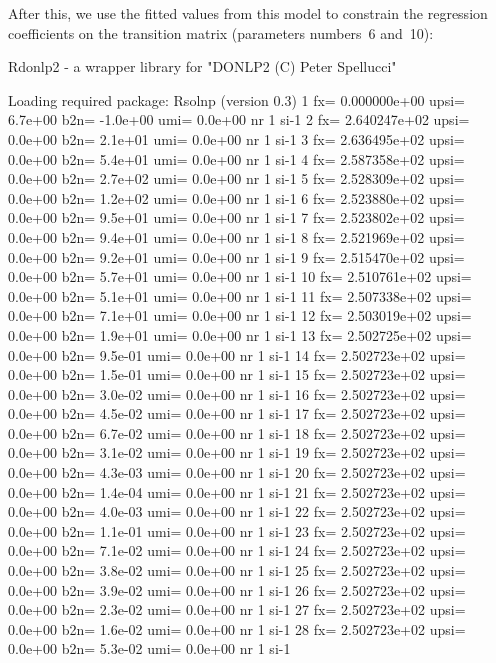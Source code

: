 \documentclass[article]{jss}
\begin{document}
After this, we use the fitted values from this model to constrain the
regression coefficients on the transition matrix (parameters numbers~6
and~10):
\begin{Schunk}
\begin{Soutput}
Rdonlp2 - a wrapper library for "DONLP2 (C) Peter Spellucci"


Loading required package: Rsolnp (version 0.3)
    1 fx=   0.000000e+00 upsi=  6.7e+00 b2n= -1.0e+00 umi=  0.0e+00 nr   1 si-1
    2 fx=   2.640247e+02 upsi=  0.0e+00 b2n=  2.1e+01 umi=  0.0e+00 nr   1 si-1
    3 fx=   2.636495e+02 upsi=  0.0e+00 b2n=  5.4e+01 umi=  0.0e+00 nr   1 si-1
    4 fx=   2.587358e+02 upsi=  0.0e+00 b2n=  2.7e+02 umi=  0.0e+00 nr   1 si-1
    5 fx=   2.528309e+02 upsi=  0.0e+00 b2n=  1.2e+02 umi=  0.0e+00 nr   1 si-1
    6 fx=   2.523880e+02 upsi=  0.0e+00 b2n=  9.5e+01 umi=  0.0e+00 nr   1 si-1
    7 fx=   2.523802e+02 upsi=  0.0e+00 b2n=  9.4e+01 umi=  0.0e+00 nr   1 si-1
    8 fx=   2.521969e+02 upsi=  0.0e+00 b2n=  9.2e+01 umi=  0.0e+00 nr   1 si-1
    9 fx=   2.515470e+02 upsi=  0.0e+00 b2n=  5.7e+01 umi=  0.0e+00 nr   1 si-1
   10 fx=   2.510761e+02 upsi=  0.0e+00 b2n=  5.1e+01 umi=  0.0e+00 nr   1 si-1
   11 fx=   2.507338e+02 upsi=  0.0e+00 b2n=  7.1e+01 umi=  0.0e+00 nr   1 si-1
   12 fx=   2.503019e+02 upsi=  0.0e+00 b2n=  1.9e+01 umi=  0.0e+00 nr   1 si-1
   13 fx=   2.502725e+02 upsi=  0.0e+00 b2n=  9.5e-01 umi=  0.0e+00 nr   1 si-1
   14 fx=   2.502723e+02 upsi=  0.0e+00 b2n=  1.5e-01 umi=  0.0e+00 nr   1 si-1
   15 fx=   2.502723e+02 upsi=  0.0e+00 b2n=  3.0e-02 umi=  0.0e+00 nr   1 si-1
   16 fx=   2.502723e+02 upsi=  0.0e+00 b2n=  4.5e-02 umi=  0.0e+00 nr   1 si-1
   17 fx=   2.502723e+02 upsi=  0.0e+00 b2n=  6.7e-02 umi=  0.0e+00 nr   1 si-1
   18 fx=   2.502723e+02 upsi=  0.0e+00 b2n=  3.1e-02 umi=  0.0e+00 nr   1 si-1
   19 fx=   2.502723e+02 upsi=  0.0e+00 b2n=  4.3e-03 umi=  0.0e+00 nr   1 si-1
   20 fx=   2.502723e+02 upsi=  0.0e+00 b2n=  1.4e-04 umi=  0.0e+00 nr   1 si-1
   21 fx=   2.502723e+02 upsi=  0.0e+00 b2n=  4.0e-03 umi=  0.0e+00 nr   1 si-1
   22 fx=   2.502723e+02 upsi=  0.0e+00 b2n=  1.1e-01 umi=  0.0e+00 nr   1 si-1
   23 fx=   2.502723e+02 upsi=  0.0e+00 b2n=  7.1e-02 umi=  0.0e+00 nr   1 si-1
   24 fx=   2.502723e+02 upsi=  0.0e+00 b2n=  3.8e-02 umi=  0.0e+00 nr   1 si-1
   25 fx=   2.502723e+02 upsi=  0.0e+00 b2n=  3.9e-02 umi=  0.0e+00 nr   1 si-1
   26 fx=   2.502723e+02 upsi=  0.0e+00 b2n=  2.3e-02 umi=  0.0e+00 nr   1 si-1
   27 fx=   2.502723e+02 upsi=  0.0e+00 b2n=  1.6e-02 umi=  0.0e+00 nr   1 si-1
   28 fx=   2.502723e+02 upsi=  0.0e+00 b2n=  5.3e-02 umi=  0.0e+00 nr   1 si-1

\end{Soutput}
\end{Schunk}
\end{document}
